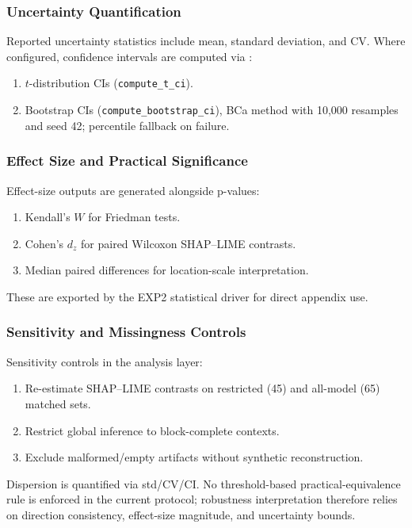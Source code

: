 \documentclass[twoside,11pt]{article}
\begin{document}
\subsubsection{Uncertainty Quantification}
Reported uncertainty statistics include mean, standard deviation, and CV. Where
configured, confidence intervals are computed via
:
\begin{enumerate}[leftmargin=*]
    \item $t$-distribution CIs (\texttt{compute\_t\_ci}).
    \item Bootstrap CIs (\texttt{compute\_bootstrap\_ci}), BCa method with
    10,000 resamples and seed 42; percentile fallback on failure.
\end{enumerate}

\subsubsection{Effect Size and Practical Significance}
Effect-size outputs are generated alongside p-values:
\begin{enumerate}[leftmargin=*]
    \item Kendall's $W$ for Friedman tests.
    \item Cohen's $d_z$ for paired Wilcoxon SHAP--LIME contrasts.
    \item Median paired differences for location-scale interpretation.
\end{enumerate}
These are exported by the EXP2 statistical driver for direct appendix use.

\subsubsection{Sensitivity and Missingness Controls}
Sensitivity controls in the analysis layer:
\begin{enumerate}[leftmargin=*]
    \item Re-estimate SHAP--LIME contrasts on restricted (45) and all-model (65) matched sets.
    \item Restrict global inference to block-complete contexts.
    \item Exclude malformed/empty artifacts without synthetic reconstruction.
\end{enumerate}
Dispersion is quantified via std/CV/CI. No threshold-based practical-equivalence
rule is enforced in the current protocol; robustness interpretation therefore
relies on direction consistency, effect-size magnitude, and uncertainty bounds.
\end{document}
